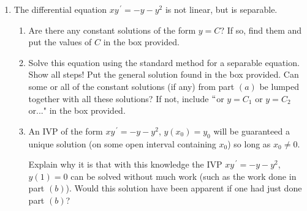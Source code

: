 \documentclass{ximera}
\begin{document}
\begin{enumerate}
\begin{enumerate}
    Explain why it is that with this knowledge the IVP $t^2y^{\,\prime}=1+y$, $y(1)=-1$ can be solved without doing much work (such as the work done in part $(b)$ or $(c)$).  Would have it been apparent if one had just done part $(b)$ or $(c)$?

    \vspace{2cm}

\end{enumerate}




\newpage

\item The differential equation $xy^{\,\prime}=-y-y^{2}$ is not linear, but is separable.

\begin{enumerate}

\item  Are there any constant solutions of the form $y=C$?  If so, find them and put the values of $C$ in the box provided.

\vfill

\hfill{}


\item  Solve this equation using the standard method for a separable equation.  Show all steps!  Put the general solution found in the box provided.  Can some or all of the constant solutions (if any) from part $(a)$ be lumped together with all these solutions?  If not, include $``$or $y=C_{1}$ or $y=C_{2}$ or..." in the box provided.


    \vfill
    \vfill


\hfill{}

\item  An IVP of the form $xy^{\,\prime}=-y-y^2$, $y(x_{0})=y_{0}$ will be guaranteed a unique solution (on some open interval containing $x_{0}$) so long as $x_{0}\neq 0$.

    Explain why it is that with this knowledge the IVP $xy^{\,\prime}=-y-y^2$, $y(1)=0$ can be solved without much work (such as the work done in part $(b)$).  Would this solution have been apparent if one had just done part $(b)$?




\end{enumerate}
\end{enumerate}
\end{document}
